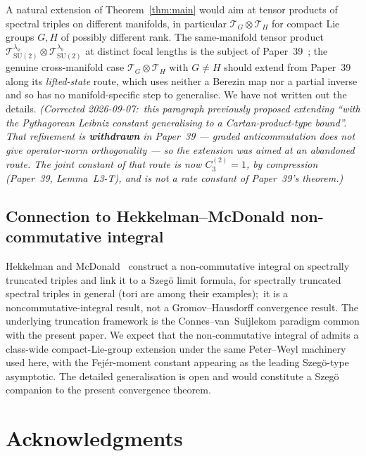 \documentclass[11pt,a4paper]{article}
\theoremstyle{plain}
\theoremstyle{definition}
\newcommand{\Tcal}{\mathcal{T}}
\newcommand{\SU}{\mathrm{SU}}
\begin{document}
A natural extension of Theorem~\ref{thm:main} would aim at tensor
products of spectral triples on different manifolds, in particular
$\Tcal_G \otimes \Tcal_H$ for compact Lie groups $G, H$ of possibly
different rank. The same-manifold tensor product
$\Tcal_{\SU(2)}^{\lambda_a} \otimes \Tcal_{\SU(2)}^{\lambda_b}$ at
distinct focal lengths is the subject of Paper~39~\cite{paper39}; the
genuine cross-manifold case $\Tcal_G \otimes \Tcal_H$ with $G \ne H$
should extend from Paper~39 along its \emph{lifted-state} route, which
uses neither a Berezin map nor a partial inverse and so has no
manifold-specific step to generalise. We have not written out the details.
\emph{(Corrected 2026-09-07:\ this paragraph previously proposed extending
``with the Pythagorean Leibniz constant generalising to a
Cartan-product-type bound''. That refinement is \textbf{withdrawn} in
Paper~39 --- graded anticommutation does not give operator-norm
orthogonality --- so the extension was aimed at an abandoned route. The
joint constant of that route is now $C_3^{(2)} = 1$, by compression
(Paper~39, Lemma~L3-T), and is not a rate constant of Paper~39's
theorem.)}

\subsection{Connection to Hekkelman--McDonald non-commutative integral}
\label{sec:hekkelman_mcdonald}

Hekkelman and McDonald~\cite{hekkelman_mcdonald2024b} construct a
non-commutative integral on spectrally truncated triples and link it
to a Szeg\"o limit formula, for spectrally truncated spectral triples
in general (tori are among their examples);\ it is a
noncommutative-integral result, not a Gromov--Hausdorff convergence
result.  The underlying truncation framework is the
Connes--van~Suijlekom paradigm common with the present paper. We expect
that the non-commutative integral of \cite{hekkelman_mcdonald2024b}
admits a class-wide compact-Lie-group extension under the same
Peter--Weyl machinery used here, with the Fej\'er-moment constant
appearing as the leading Szeg\"o-type asymptotic. The detailed
generalisation is open and would constitute a Szeg\"o companion to
the present convergence theorem.

\section*{Acknowledgments}
\end{document}
